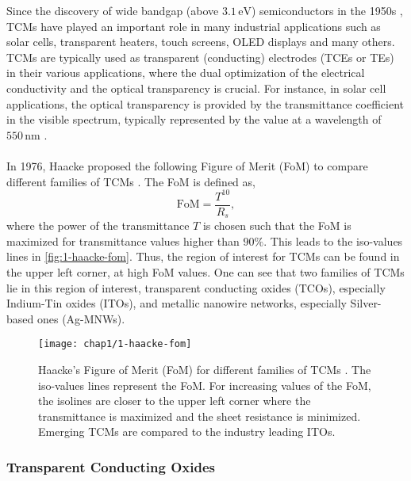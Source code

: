     Since the discovery of wide bandgap (above $3.1\,\text{eV}$) semiconductors in the 1950s \cite{Nguyen2022}, TCMs have played an important role in many industrial applications such as solar cells, transparent heaters, touch screens, OLED displays and many others. TCMs are typically used as transparent (conducting) electrodes (TCEs or TEs) in their various applications, where the dual optimization of the electrical conductivity and the optical transparency is crucial. For instance, in solar cell applications, the optical transparency is provided by the transmittance coefficient in the visible spectrum, typically represented by the value at a wavelength of $550\,\text{nm}$ \cite{LangleyGiustiMayousseCelleBelletSimonato2013}.\\\\
    In 1976, Haacke proposed the following Figure of Merit (FoM) to compare different families of TCMs \cite{Haacke1976}. The FoM is defined as,
    \begin{equation*}
        \text{FoM} = \frac{T^{10}}{R_s},
    \end{equation*}
    where the power of the transmittance $T$ is chosen such that the FoM is maximized for transmittance values higher than $90\%$. This leads to the iso-values lines in \autoref{fig:1-haacke-fom}. Thus, the region of interest for TCMs can be found in the upper left corner, at high FoM values. One can see that two families of TCMs lie in this region of interest, transparent conducting oxides (TCOs), especially Indium-Tin oxides (ITOs), and metallic nanowire networks, especially Silver-based ones (Ag-MNWs).
    \begin{figure}[H]
        \centering
        \texttt{[image: chap1/1-haacke-fom]}
        \caption{Haacke's Figure of Merit (FoM) for different families of TCMs \cite{Nguyen2022}. The iso-values lines represent the FoM. For increasing values of the FoM, the isolines are closer to the upper left corner where the transmittance is maximized and the sheet resistance is minimized. Emerging TCMs are compared to the industry leading ITOs.}
        \label{fig:1-haacke-fom}
    \end{figure}

    \subsubsection{Transparent Conducting Oxides}

